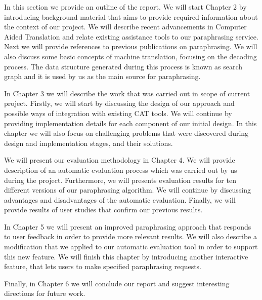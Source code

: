 In this section we provide an outline of the report. We will start Chapter 2 by introducing background material that aims to provide required information about the context of our project. We will describe recent advancements in Computer Aided Translation and relate existing assistance tools to our paraphrasing service. Next we will provide references to previous publications on paraphrasing. We will also discuss some basic concepts of machine translation, focusing on the decoding process. The data structure generated during this process is known as search graph and it is used by us as the main source for paraphrasing. 

In Chapter 3 we will describe the work that was carried out in scope of current project. Firstly, we will start by discussing the design of our approach and possible ways of integration with existing CAT tools. We will continue by providing implementation details for each component of our initial design. In this chapter we will also focus on challenging problems that were discovered during design and implementation stages, and their solutions.

We will present our evaluation methodology in Chapter 4. We will provide description of an automatic evaluation process which was carried out by us during the project. Furthermore, we will presents evaluation results for ten different versions of our paraphrasing algorithm. We will continue by discussing advantages and disadvantages of the automatic evaluation. Finally, we will provide results of user studies that confirm our previous results.

In Chapter 5 we will present an improved paraphrasing approach that responds to user feedback in order to provide more relevant results. We will also describe a modification that we applied to our automatic evaluation tool in order to support this new feature. We will finish this chapter by introducing another interactive feature, that lets users to make specified paraphrasing requests.  

Finally, in Chapter 6 we will conclude our report and suggest interesting directions for future work. 
